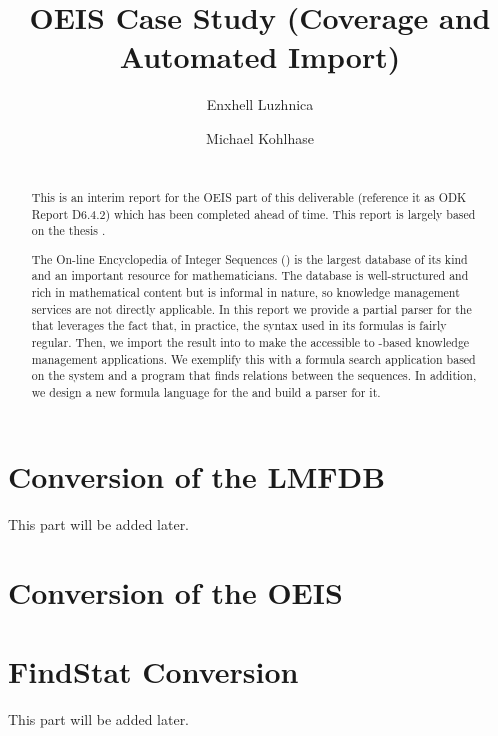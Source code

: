 \documentclass[book]{deliverablereport}
\title{OEIS Case Study (Coverage and Automated Import)}
\author{Enxhell Luzhnica}
\author{Michael Kohlhase}
\begin{document}
\begin{abstract}\strut\\
  {\color{red} This is an interim report for the OEIS part of this deliverable (reference
    it as ODK Report D6.4.2) which has been completed ahead of time. This report is
    largely based on the thesis \cite{Luzhnica:bsc16}.}

  \begin{sffamily}
  The On-line Encyclopedia of Integer Sequences (\oeis) is the largest database of its
  kind and an important resource for mathematicians. The database is well-structured and
  rich in mathematical content but is informal in nature, so knowledge management services
  are not directly applicable.  In this report we provide a partial parser for the \oeis
  that leverages the fact that, in practice, the syntax used in its formulas is fairly
  regular. Then, we import the result into \omdoc to make the \oeis accessible to
  \omdoc-based knowledge management applications. We exemplify this with a formula search
  application based on the \mws system and a program that finds relations between the
  \oeis sequences.  In addition, we design a new formula language for the \oeis and build
  a parser for it.
  \end{sffamily}
\end{abstract}
\maketitle

\newpage
\tableofcontents
\newpage
\chapter{Conversion of the LMFDB}
This part will be added later. 

\chapter{Conversion of the OEIS}









\chapter{FindStat Conversion}
This part will be added later. 

\newpage\printbibliography
\cleardoublepage


\nocite{IanKoh:mlkmim15}
\nocite{RabKoh:WSMSML13}
\nocite{Rabe:MAGMS13}
\nocite{oeis}
\nocite{DBLP:conf/lwa/LuzhnicaIK15}
\nocite{DBLP:conf/icms/LuzhnicaK16}
\end{document}
